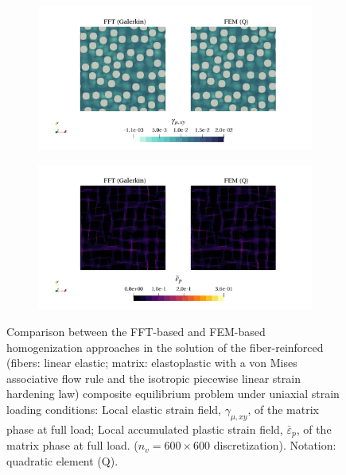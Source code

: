 \begin{figure}[hbt]
  \centering
	\begin{subfigure}[b]{\textwidth}
    \centering
    \includegraphics[width=\textwidth]{figures/von_mises_res_mat_small_strain_2D_shear_elastic_strain_12}
    \caption{}
    \label{subfig:von_mises_res_mat_small_strain_2D_shear_elastic_strain_12}
  \end{subfigure}
  \begin{subfigure}[b]{\textwidth}
    \centering
    \includegraphics[width=\textwidth]{figures/von_mises_res_mat_small_strain_2D_shear_palstic_strain}
    \caption{}
    \label{subfig:von_mises_res_mat_small_strain_2D_shear_palstic_strain}
  \end{subfigure}
  \caption{Comparison between the FFT-based and FEM-based homogenization approaches in the
  solution of the fiber-reinforced (fibers: linear elastic; matrix: elastoplastic with a von Mises associative flow rule and the isotropic piecewise linear strain hardening law) composite equilibrium problem under uniaxial
  strain loading conditions:  Local elastic strain field, \(\gamma_{\mu,xy}\), of the matrix phase at full load;  Local accumulated plastic strain field, \(\bar{\varepsilon}_{p}\), of the matrix phase at full load.  (\(n_v = 600 \times 600\) discretization). Notation: quadratic element (Q).}
\label{fig:von_mises_res_mat_small_strain_2D_shear_local_fields}
\end{figure}



